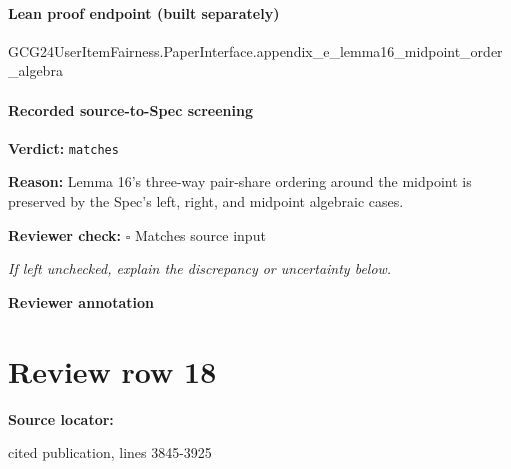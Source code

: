 \documentclass[10pt]{article}
\newcommand{\reviewerbox}{%
  \par\noindent\fbox{\parbox{0.96\linewidth}{\rule{0pt}{0.38in}}}\par
}
\newcommand{\reviewmatch}[1]{%
  \par\noindent\textbf{Reviewer check:} $\square$\; #1\par
  \noindent\emph{If left unchecked, explain the discrepancy or uncertainty below.}\par
}
\begin{document}
\paragraph{Lean proof endpoint (built separately)}\begin{ReviewVerbatim}
GCG24UserItemFairness.PaperInterface.appendix_e_lemma16_midpoint_order_algebra
\end{ReviewVerbatim}

\paragraph{Recorded source-to-Spec screening}
\textbf{Verdict:} \texttt{matches}
\\
{\raggedright
\textbf{Reason:} Lemma 16's three-\allowbreak{}way pair-\allowbreak{}share ordering around the midpoint is preserved by the Spec's left, right, and midpoint algebraic cases.\allowbreak{}
\par}
\reviewmatch{Matches source input}
\noindent\textbf{Reviewer annotation}\par
\reviewerbox
\clearpage
\hypertarget{source-claim-cac20912e50cfdb7}{}
\section*{Review row 18}
\textbf{Source locator:} {\footnotesize\raggedright cited publication, lines 3845-\allowbreak{}3925\par}
\end{document}
